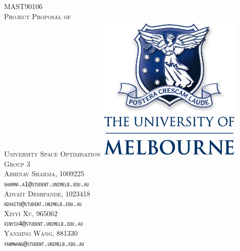 \begin{titlepage}
\center %
 
\vfill
\textsc{\large{MAST90106} \\[1cm]
\large{Project Proposal of} \\[0.2cm]\LARGE{University Space Optimisation}}
\vfill
\includegraphics[width=7cm]{resources/images/unimelblogo.png}
\vfill
\textsc{\LARGE{Group 3}}
\vspace{5mm}\\
\textsc{ Abhinav Sharma, 1009225\\
    \texttt{sharma.a1@student.unimelb.edu.au} }\\
    \vspace{5mm}
\textsc{ Advait Deshpande, 1023418\\
    \texttt{advaitd@student.unimelb.edu.au}}\\
    \vspace{5mm}
\textsc{ Xinyi Xu, 965062\\
    \texttt{xinyix4@student.unimelb.edu.au}}\\
    \vspace{5mm}
\textsc{ Yanming Wang, 881330\\
    \texttt{yanmwang@student.unimelb.edu.au}}
\end{titlepage}
